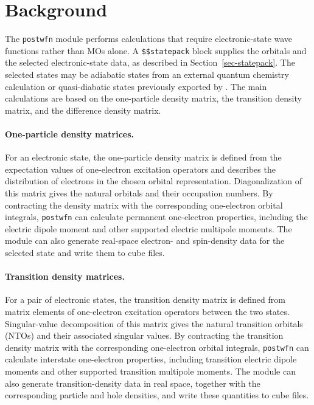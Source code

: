 \section{Background}
The \texttt{postwfn} module performs calculations that require electronic-state wave functions rather than MOs alone. A \texttt{\$\$statepack} block supplies the orbitals and the selected electronic-state data, as described in Section~\ref{sec-statepack}. The selected states may be adiabatic states from an external quantum chemistry calculation or quasi-diabatic states previously exported by \progname{}. The main calculations are based on the one-particle density matrix, the transition density matrix, and the difference density matrix.

\paragraph{One-particle density matrices.}
For an electronic state, the one-particle density matrix is defined from the expectation values of one-electron excitation operators and describes the distribution of electrons in the chosen orbital representation. Diagonalization of this matrix gives the natural orbitals and their occupation numbers. By contracting the density matrix with the corresponding one-electron orbital integrals, \texttt{postwfn} can calculate permanent one-electron properties, including the electric dipole moment and other supported electric multipole moments. The module can also generate real-space electron- and spin-density data for the selected state and write them to cube files.

\paragraph{Transition density matrices.}
For a pair of electronic states, the transition density matrix is defined from matrix elements of one-electron excitation operators between the two states. Singular-value decomposition of this matrix gives the natural transition orbitals (NTOs) and their associated singular values. By contracting the transition density matrix with the corresponding one-electron orbital integrals, \texttt{postwfn} can calculate interstate one-electron properties, including transition electric dipole moments and other supported transition multipole moments. The module can also generate transition-density data in real space, together with the corresponding particle and hole densities, and write these quantities to cube files.

